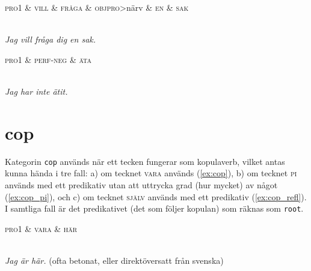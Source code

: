 \documentclass[11pt,a4paper]{article}
\begin{document}
\begin{example}
\label{ex:aux_vill}
\begin{dependency}[theme = simple]
   \begin{deptext}[column sep=1em]
      \textsc{pro1} \& \textsc{vill} \& \textsc{fråga} \& \textsc{objpro}{\textgreater}närv \& \textsc{en} \& \textsc{sak} \\
   \end{deptext}
\end{dependency}
\\
\textit{Jag vill fråga dig en sak.}
\end{example}

\begin{example}
\label{ex:aux_neg}
\begin{dependency}[theme = simple]
   \begin{deptext}[column sep=1em]
      \textsc{pro1} \& \textsc{perf-neg} \& \textsc{äta} \\
   \end{deptext}
\end{dependency}
\\
\textit{Jag har inte ätit.}
\end{example}

\section{cop}
Kategorin \texttt{cop} används när ett tecken fungerar som kopulaverb, vilket antas kunna hända i tre fall: a) om tecknet \textsc{vara} används (\ref{ex:cop}), b) om tecknet \textsc{pi} används med ett predikativ utan att uttrycka grad (hur mycket) av något (\ref{ex:cop_pi}), och c) om tecknet \textsc{själv} används med ett predikativ (\ref{ex:cop_refl}). I samtliga fall är det predikativet (det som följer kopulan) som räknas som \texttt{root}.

\begin{example}
\label{ex:cop}
\begin{dependency}[theme = simple]
   \begin{deptext}[column sep=1em]
      \textsc{pro1} \& \textsc{vara} \& \textsc{här} \\
   \end{deptext}
\end{dependency}
\\
\textit{Jag är här.} (ofta betonat, eller direktöversatt från svenska)
\end{example}
\end{document}
